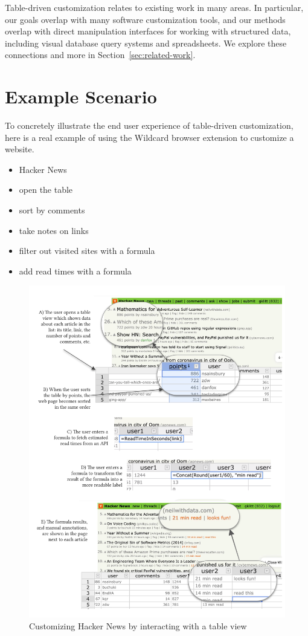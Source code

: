\documentclass[sigplan,10pt,anonymous,review]{acmart}
\providecommand{\tightlist}{%
  \setlength{\itemsep}{0pt}\setlength{\parskip}{0pt}}
\begin{document}
Table-driven customization relates to existing work in many areas. In
particular, our goals overlap with many software customization tools,
and our methods overlap with direct manipulation interfaces for working
with structured data, including visual database query systems and
spreadsheets. We explore these connections and more in
Section~\ref{sec:related-work}.

\hypertarget{sec:examples}{%
\section{Example Scenario}\label{sec:examples}}

To concretely illustrate the end user experience of table-driven
customization, here is a real example of using the Wildcard browser
extension to customize a website.

\begin{itemize}
\tightlist
\item
  Hacker News
\item
  open the table
\item
  sort by comments
\item
  take notes on links
\item
  filter out visited sites with a formula
\item
  add read times with a formula
\end{itemize}

\begin{figure}
\hypertarget{fig:hacker-news}{%
\centering
\includegraphics[width=\textwidth]{media/hacker-news.png}
\caption{Customizing Hacker News by interacting with a table view}\label{fig:hacker-news}
}
\end{figure}
\end{document}
